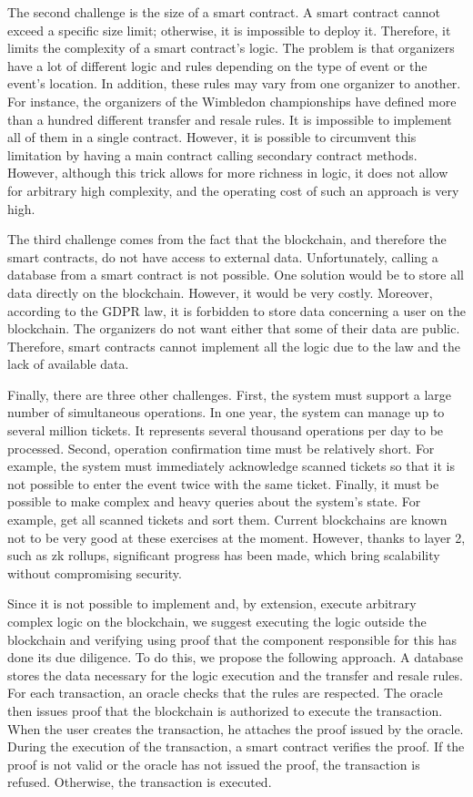 \documentclass[a4paper,11pt,oneside]{report}
\begin{document}
The second challenge is the size of a smart contract. A smart contract cannot exceed a specific size limit; otherwise, it is impossible to deploy it. Therefore, it limits the complexity of a smart contract's logic. The problem is that organizers have a lot of different logic and rules depending on the type of event or the event's location. In addition, these rules may vary from one organizer to another. For instance, the organizers of the Wimbledon championships have defined more than a hundred different transfer and resale rules. It is impossible to implement all of them in a single contract. However, it is possible to circumvent this limitation by having a main contract calling secondary contract methods. However, although this trick allows for more richness in logic, it does not allow for arbitrary high complexity, and the operating cost of such an approach is very high.

The third challenge comes from the fact that the blockchain, and therefore the smart contracts, do not have access to external data. Unfortunately, calling a database from a smart contract is not possible. One solution would be to store all data directly on the blockchain. However, it would be very costly. Moreover, according to the GDPR law, it is forbidden to store data concerning a user on the blockchain. The organizers do not want either that some of their data are public. Therefore, smart contracts cannot implement all the logic due to the law and the lack of available data.

Finally, there are three other challenges. First, the system must support a large number of simultaneous operations. In one year, the system can manage up to several million tickets. It represents several thousand operations per day to be processed. Second, operation confirmation time must be relatively short. For example, the system must immediately acknowledge scanned tickets so that it is not possible to enter the event twice with the same ticket. Finally, it must be possible to make complex and heavy queries about the system's state. For example, get all scanned tickets and sort them. Current blockchains are known not to be very good at these exercises at the moment. However, thanks to layer 2, such as zk rollups, significant progress has been made, which bring scalability without compromising security.

Since it is not possible to implement and, by extension, execute arbitrary complex logic on the blockchain, we suggest executing the logic outside the blockchain and verifying using proof that the component responsible for this has done its due diligence. To do this, we propose the following approach. A database stores the data necessary for the logic execution and the transfer and resale rules. For each transaction, an oracle checks that the rules are respected. The oracle then issues proof that the blockchain is authorized to execute the transaction. When the user creates the transaction, he attaches the proof issued by the oracle. During the execution of the transaction, a smart contract verifies the proof. If the proof is not valid or the oracle has not issued the proof, the transaction is refused. Otherwise, the transaction is executed.
\end{document}
